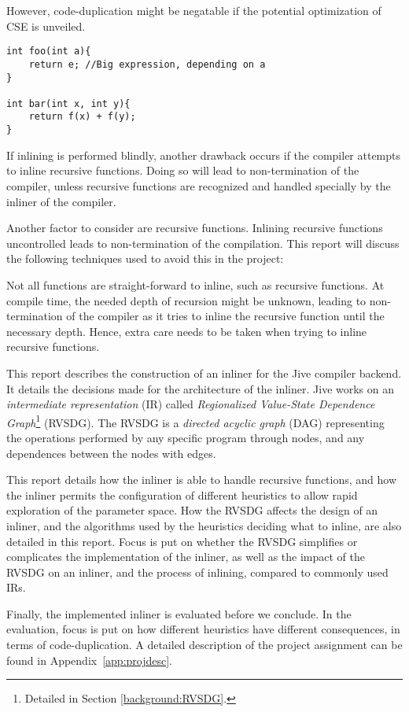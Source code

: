 However, code-duplication might be negatable if the potential optimization of
CSE is unveiled.

\begin{lstlisting}[label={lst:code-dup}, style=global_customcpp,
caption={Code duplication in \lstinline!bar()!, when inlining \lstinline!foo()!
into \lstinline!bar()!.}]
int foo(int a){
	return e; //Big expression, depending on a
}

int bar(int x, int y){
	return f(x) + f(y);
}
\end{lstlisting}
\vspace{-4\parskip} %

If inlining is performed blindly, another drawback occurs if the compiler
attempts to inline recursive functions. Doing so will lead to non-termination of
the compiler, unless recursive functions are recognized and handled specially by
the inliner of the compiler.

Another factor to consider are recursive functions. Inlining recursive functions
uncontrolled leads to non-termination of the compilation. This report will
discuss the following techniques used to avoid this in the project:

Not all functions are straight-forward to inline, such as recursive functions.
At compile time, the needed depth of recursion might be unknown, leading to
non-termination of the compiler as it tries to inline the recursive function
until the necessary depth. Hence, extra care needs to be taken when trying to
inline recursive functions.

This report describes the construction of an inliner for the Jive compiler
backend. It details the decisions made for the architecture of the inliner. Jive
works on an \textit{intermediate representation} (IR) called
\textit{Regionalized Value-State Dependence Graph}\footnote{Detailed in Section
\ref{background:RVSDG}.} (RVSDG). The RVSDG is a \textit{directed acyclic graph}
(DAG) representing the operations performed by any specific program through
nodes, and any dependences between the nodes with edges.


This report details how the inliner is able to handle recursive functions, and
how the inliner permits the configuration of different heuristics to allow rapid
exploration of the parameter space. How the RVSDG affects the design of an
inliner, and the algorithms used by the heuristics deciding what to inline, are
also detailed in this report. Focus is put on whether the RVSDG simplifies or
complicates the implementation of the inliner, as well as the impact of the
RVSDG on an inliner, and the process of inlining, compared to commonly used IRs.

Finally, the implemented inliner is evaluated before we conclude. In the
evaluation, focus is put on how different heuristics have different
consequences, in terms of code-duplication. A detailed description of the
project assignment can be found in Appendix~\ref{app:projdesc}.
